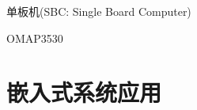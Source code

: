 \begin{frame}{}
\begin{center}\end{center}
\end{frame}
\begin{frame}{}
\begin{center}\end{center}
\end{frame}
\begin{frame}{}
\begin{center}\end{center}
\end{frame}
\begin{frame}{}
\begin{center}\end{center}
\end{frame}
\begin{frame}{}
\begin{center}\end{center}
\end{frame}
\begin{frame}{}
\begin{center}\end{center}
\end{frame}

\begin{frame}{单板机(SBC: Single Board Computer)}
\begin{center}\end{center}
\end{frame}

\begin{frame}{}
\begin{center}\end{center}
\end{frame}

\begin{frame}{OMAP3530}
\begin{center}\end{center}
\end{frame}

\section{嵌入式系统应用}

